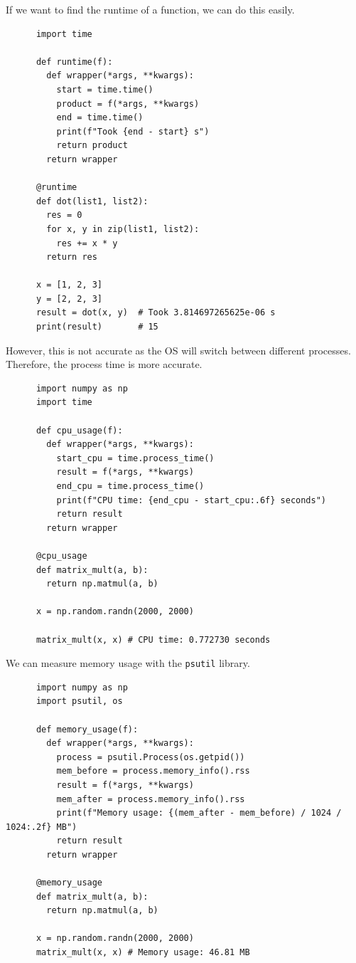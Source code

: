   \begin{example}
    \label{ex:measuring-total-and-cpu-runtime}
    If we want to find the runtime of a function, we can do this easily. 

    \begin{lstlisting}
      import time 

      def runtime(f): 
        def wrapper(*args, **kwargs): 
          start = time.time() 
          product = f(*args, **kwargs) 
          end = time.time() 
          print(f"Took {end - start} s") 
          return product
        return wrapper

      @runtime
      def dot(list1, list2): 
        res = 0 
        for x, y in zip(list1, list2): 
          res += x * y 
        return res

      x = [1, 2, 3]
      y = [2, 2, 3]
      result = dot(x, y)  # Took 3.814697265625e-06 s 
      print(result)       # 15 
    \end{lstlisting}

    However, this is not accurate as the OS will switch between different processes. Therefore, the process time is more accurate. 

    \begin{lstlisting}
      import numpy as np
      import time

      def cpu_usage(f):
        def wrapper(*args, **kwargs):
          start_cpu = time.process_time()
          result = f(*args, **kwargs)
          end_cpu = time.process_time()
          print(f"CPU time: {end_cpu - start_cpu:.6f} seconds")
          return result
        return wrapper

      @cpu_usage
      def matrix_mult(a, b): 
        return np.matmul(a, b)

      x = np.random.randn(2000, 2000)

      matrix_mult(x, x) # CPU time: 0.772730 seconds
    \end{lstlisting}
  \end{example}

  \begin{example}
    \label{ex:memory-usage}
    We can measure memory usage with the \texttt{psutil} library. 
    \begin{lstlisting}
      import numpy as np
      import psutil, os 

      def memory_usage(f):
        def wrapper(*args, **kwargs):
          process = psutil.Process(os.getpid())
          mem_before = process.memory_info().rss
          result = f(*args, **kwargs)
          mem_after = process.memory_info().rss
          print(f"Memory usage: {(mem_after - mem_before) / 1024 / 1024:.2f} MB")
          return result
        return wrapper

      @memory_usage 
      def matrix_mult(a, b): 
        return np.matmul(a, b)

      x = np.random.randn(2000, 2000)
      matrix_mult(x, x) # Memory usage: 46.81 MB
    \end{lstlisting}
  \end{example}

